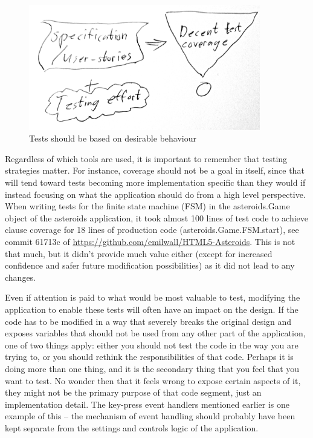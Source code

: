 \documentclass[11pt]{article}
\begin{document}
\begin{figure}[h]
\centering
\includegraphics[width=0.9\textwidth]{pics/coverage.jpg}
\caption{Tests should be based on desirable behaviour}
\label{fig:coverage}
\end{figure}

Regardless of which tools are used, it is important to remember that testing strategies matter. For instance, coverage should not be a goal in itself, since that will tend toward tests becoming more implementation specific than they would if instead focusing on what the application should do from a high level perspective. When writing tests for the finite state machine (FSM) in the asteroids.Game object of the asteroids application, it took almost 100 lines of test code to achieve clause coverage \cite[p.~106]{AmmannOffutt} for 18 lines of production code (asteroids.Game.FSM.start), see commit 61713c of \url{https://github.com/emilwall/HTML5-Asteroids}. This is not that much, but it didn't provide much value either (except for increased confidence and safer future modification possibilities) as it did not lead to any changes.

Even if attention is paid to what would be most valuable to test, modifying the application to enable these tests will often have an impact on the design. If the code has to be modified in a way that severely breaks the original design and exposes variables that should not be used from any other part of the application, one of two things apply: either you should not test the code in the way you are trying to, or you should rethink the responsibilities of that code. Perhaps it is doing more than one thing, and it is the secondary thing that you feel that you want to test. No wonder then that it feels wrong to expose certain aspects of it, they might not be the primary purpose of that code segment, just an implementation detail. The key-press event handlers mentioned earlier is one example of this -- the mechanism of event handling should probably have been kept separate from the settings and controls logic of the application.
\end{document}
